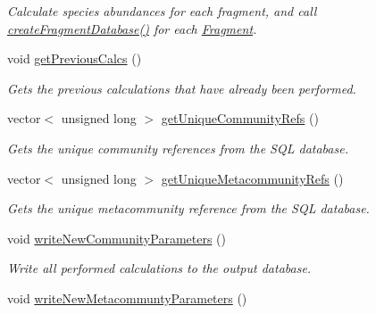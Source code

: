 \begin{DoxyCompactItemize}
\begin{DoxyCompactList}\small\item\em Calculate species abundances for each fragment, and call \hyperlink{class_community_ad6515ff43ea8189a1acdcccfe893bbba}{create\+Fragment\+Database()} for each \hyperlink{struct_fragment}{Fragment}. \end{DoxyCompactList}\item 
void \hyperlink{class_community_a24c425f32b1e3b10227e2d04cbacfe31}{get\+Previous\+Calcs} ()\hypertarget{class_community_a24c425f32b1e3b10227e2d04cbacfe31}{}\label{class_community_a24c425f32b1e3b10227e2d04cbacfe31}

\begin{DoxyCompactList}\small\item\em Gets the previous calculations that have already been performed. \end{DoxyCompactList}\item 
vector$<$ unsigned long $>$ \hyperlink{class_community_aed61108d8c4fd42d39a9112c5062cad4}{get\+Unique\+Community\+Refs} ()
\begin{DoxyCompactList}\small\item\em Gets the unique community references from the S\+QL database. \end{DoxyCompactList}\item 
vector$<$ unsigned long $>$ \hyperlink{class_community_a257e8e3dce33b235985ed9d167817a89}{get\+Unique\+Metacommunity\+Refs} ()
\begin{DoxyCompactList}\small\item\em Gets the unique metacommunity reference from the S\+QL database. \end{DoxyCompactList}\item 
void \hyperlink{class_community_afbc8709084a00a7450e3a168cb016db9}{write\+New\+Community\+Parameters} ()\hypertarget{class_community_afbc8709084a00a7450e3a168cb016db9}{}\label{class_community_afbc8709084a00a7450e3a168cb016db9}

\begin{DoxyCompactList}\small\item\em Write all performed calculations to the output database. \end{DoxyCompactList}\item 
void \hyperlink{class_community_ac900c23ffe2572504fca11f20b7ba8cd}{write\+New\+Metacommunty\+Parameters} ()\hypertarget{class_community_ac900c23ffe2572504fca11f20b7ba8cd}{}\label{class_community_ac900c23ffe2572504fca11f20b7ba8cd}


\end{DoxyCompactItemize}
